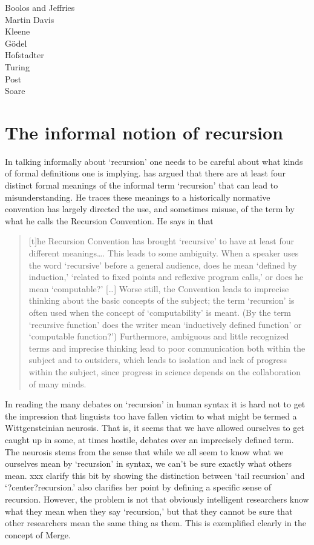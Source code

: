 \documentclass[11pt]{article}
\begin{document}
Boolos and Jeffries\\
Martin Davis\\
Kleene\\
G\"odel\\
Hofstadter\\
Turing\\
Post\\
Soare\\

\section{The informal notion of recursion}
In talking informally about `recursion' one needs to be careful about what kinds of formal definitions one is implying. \cite{soare:1996} has argued that there are at least four distinct formal meanings of the informal term `recursion' that can lead to misunderstanding. He traces these meanings to a historically normative convention has largely directed the use, and sometimes misuse, of the term by what he calls the Recursion Convention. He says in \citep{soare:1996} that

	\begin{quotation} 
[t]he Recursion Convention has brought `recursive' to have at least four different	meanings\dots. This leads to some ambiguity. When a speaker uses the word `recursive' before a general audience, does he mean `defined by induction,' `related to fixed points and reflexive program calls,' or does he mean 	`computable?' [\ldots] Worse still, the Convention leads to imprecise thinking about the basic concepts of the subject; the term `recursion' is often used when the concept of `computability' is meant. (By the term `recursive function' does the 	writer mean `inductively defined function' or `computable function?') Furthermore, ambiguous and little recognized terms and imprecise thinking lead to poor communication both within the subject and to outsiders, which leads to isolation and lack of progress within the subject, since progress in science depends on the collaboration of many minds.
  \end{quotation}
  
In reading the many debates on `recursion' in human syntax it is hard not to get the impression that linguists too have fallen victim to what might be termed a Wittgensteinian neurosis. That is, it seems that we have allowed ourselves to get caught up in some, at times hostile, debates over an imprecisely defined term. The neurosis stems from the sense that while we all seem to know what we ourselves mean by `recursion' in syntax, we can't be sure exactly what others mean. \citep{jp:2005}{xxx} clarify this bit by showing the distinction between `tail recursion' and `?center?recursion.' \cite{parker06recursion} also clarifies her point by defining a specific sense of recursion. However, the problem is not that obviously intelligent researchers know what they mean when they say `recursion,' but that they cannot be sure that other researchers mean the same thing as them. This is exemplified clearly in the concept of Merge.
\end{document}
